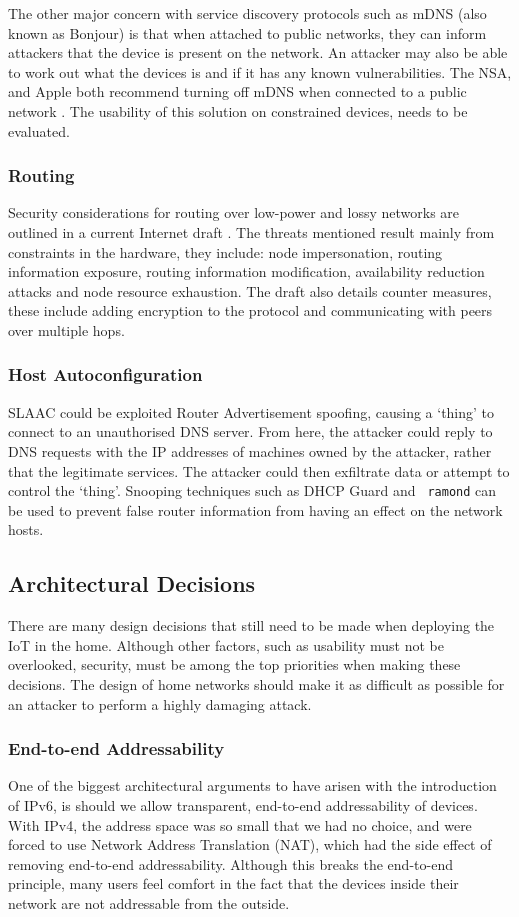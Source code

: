 \documentclass[10pt,journal,compsoc]{IEEEtran}
\begin{document}
The other major concern with service discovery protocols such as mDNS (also
known as Bonjour) is that when attached to public networks, they can inform
attackers that the device is present on the network. An attacker may also be
able to work out what the devices is and if it has any known vulnerabilities.
The NSA, and Apple both recommend turning off mDNS when connected to a public
network \cite{NSAMacHardening} \cite{MacConfig}. The usability of this solution
on constrained devices, needs to be evaluated. 

\subsubsection{Routing}
Security considerations for routing over low-power and lossy networks are
outlined in a current Internet draft \cite{Tsao2014}. The threats mentioned
result mainly from constraints in the hardware, they include: node
impersonation, routing information exposure, routing information modification,
availability reduction attacks and node resource exhaustion. The draft also
details counter measures, these include adding encryption to the protocol and
communicating with peers over multiple hops.

\subsubsection{Host Autoconfiguration}
SLAAC could be exploited Router Advertisement spoofing, causing a `thing' to
connect to an unauthorised DNS server. From here, the attacker could reply to
DNS requests with the IP addresses of machines owned by the attacker, rather
that the legitimate services. The attacker could then exfiltrate data or
attempt to control the `thing'. Snooping techniques such as DHCP Guard and {\tt
ramond} can be used to prevent false router information from having an effect
on the network hosts.  

\subsection{Architectural Decisions}
There are many design decisions that still need to be made when deploying the
IoT in the home. Although other factors, such as usability must not be
overlooked, security, must be among the top priorities when making these
decisions.  The design of home networks should make it as difficult as possible
for an attacker to perform a highly damaging attack. 

\subsubsection{End-to-end Addressability}
One of the biggest architectural arguments to have arisen with the introduction
of IPv6, is should we allow transparent, end-to-end addressability of devices.
With IPv4, the address space was so small that we had no choice, and were
forced to use Network Address Translation (NAT), which had the side effect of
removing end-to-end addressability. Although this breaks the end-to-end
principle, many users feel comfort in the fact that the devices inside their
network are not addressable from the outside.  
\end{document}
